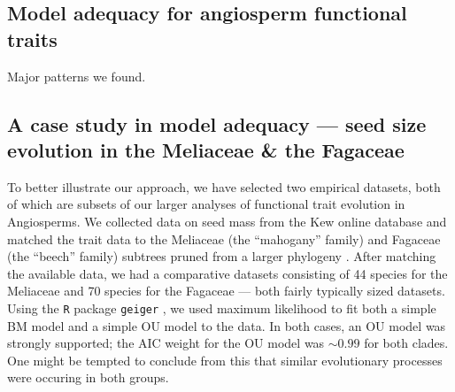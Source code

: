\documentclass[a4paper,12pt]{article}
\begin{document}
\subsection{Model adequacy for angiosperm functional traits}
Major patterns we found.

\subsection*{A case study in model adequacy --- seed size evolution in the Meliaceae \& the Fagaceae}
To better illustrate our approach, we have selected two empirical datasets, both of which are subsets of our larger analyses of functional trait evolution in Angiosperms. We collected data on seed mass from the Kew online database \citep{Kew2008} and matched the trait data to the Meliaceae (the ``mahogany'' family) and Fagaceae (the ``beech'' family) subtrees pruned from a larger phylogeny \citep{Zanne2013}. After matching the available data, we had a comparative datasets consisting of 44 species for the Meliaceae and 70 species for the Fagaceae --- both fairly typically sized datasets.  Using the \texttt{R} package \texttt{geiger} \citep{geiger}, we used maximum likelihood to fit both a simple BM model and a simple OU model to the data. In both cases, an OU model was strongly supported; the AIC weight for the OU model was $\sim 0.99$ for both clades. One might be tempted to conclude from this that similar evolutionary processes were occuring in both groups. 
\end{document}
